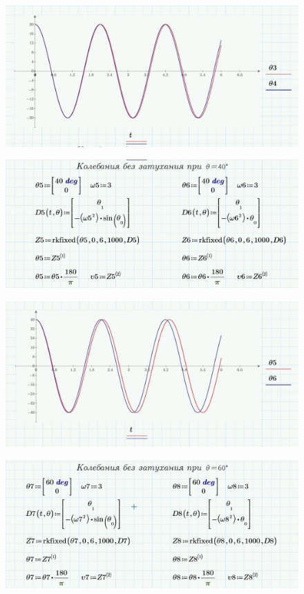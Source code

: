 \documentclass[a4paper, 14pt]{extarticle}
\begin{document}
		\begin{figure}[H]
			\centering
			\includegraphics[width = \linewidth]{4.jpg}
		\end{figure}
		\begin{figure}[H]
			\centering
			\includegraphics[width = \linewidth]{5.jpg}
		\end{figure}
		\begin{figure}[H]
			\centering
			\includegraphics[width = \linewidth]{6.jpg}
		\end{figure}
		\begin{figure}[H]
			\centering
			\includegraphics[width = \linewidth]{7.jpg}
		\end{figure}
\end{document}
